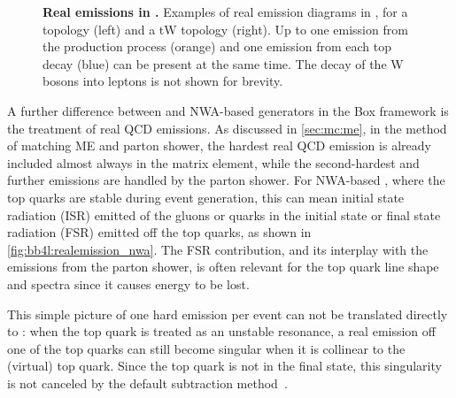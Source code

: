 \begin{figure}[th]
    \caption{\textbf{Real emissions in \bbfourl.} Examples of real emission diagrams in \bbfourl, for a \ttbar topology (left) and a tW topology (right). Up to one emission from the production process (orange) and one emission from each top decay (blue) can be present at the same time. The decay of the W bosons into leptons is not shown for brevity.}
    \label{fig:bb4l:realemission_bb4l}
\end{figure}

A further difference between \bbfourl and NWA-based \ttbar generators in the \powheg Box framework is the treatment of real QCD emissions. As discussed in \cref{sec:mc:me}, in the \powheg method of matching ME and parton shower, the hardest real QCD emission is already included almost always in the matrix element, while the second-hardest and further emissions are handled by the parton shower. For NWA-based \ttbar, where the top quarks are stable during event generation, this can mean initial state radiation (ISR) emitted of the gluons or quarks in the initial state or final state radiation (FSR) emitted off the top quarks, as shown in \cref{fig:bb4l:realemission_nwa}. The FSR contribution, and its interplay with the emissions from the parton shower, is often relevant for the top quark line shape and \pt spectra since it causes energy to be lost.

This simple picture of one hard emission per event can not be translated directly to {\bbfourl}: when the top quark is treated as an unstable resonance, a real emission off one of the top quarks can still become singular when it is collinear to the (virtual) top quark. Since the top quark is not in the final state, this singularity is not canceled by the default \powheg subtraction method~\cite{Jezo:2015aia}.

